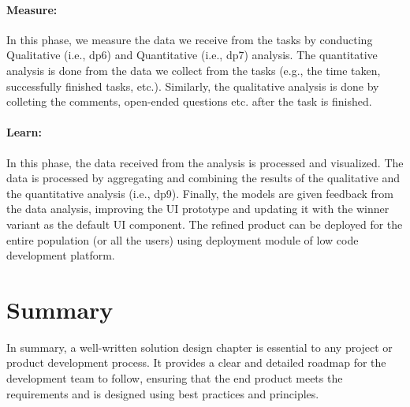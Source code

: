 \paragraph{Measure:}
\label{design:paragraph:measure}
In this phase, we measure the data we receive from the tasks by conducting Qualitative (i.e., \ac{dp}6) and Quantitative (i.e., \ac{dp}7) analysis.
The quantitative analysis is done from the data we collect from the tasks (e.g., the time taken, successfully finished tasks, etc.).
Similarly, the qualitative analysis is done by colleting the comments, open-ended questions etc. after the task is finished. 
\paragraph{Learn:}
\label{design:paragraph:learn}
In this phase, the data received from the analysis is processed and visualized. The data is processed by aggregating and combining the results of the qualitative and the quantitative analysis (i.e., \ac{dp}9). 
Finally, the models are given feedback from the data analysis, improving the UI prototype and updating it with the winner variant as the default UI component.
The refined product can be deployed for the entire population (or all the users) using deployment module of low code development platform.

\section{Summary}
\label{design:section:summary}
In summary, a well-written solution design chapter is essential to any project or product development process. 
It provides a clear and detailed roadmap for the development team to follow, ensuring that the end product meets the requirements and is designed using best practices and principles.